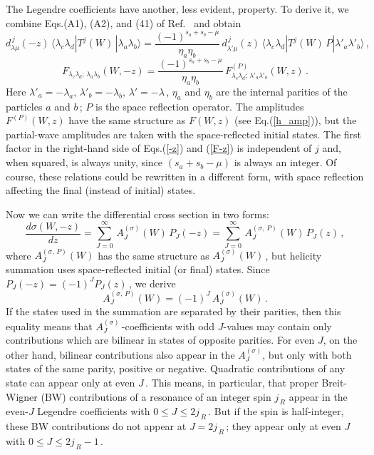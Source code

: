 \documentclass[prc,reprint,onecolumn,amsmath,amssymb,superscriptaddress]{revtex4-1}
\newcommand{\be}{\begin{equation}}
\newcommand{\ee}{\end{equation}}
\begin{document}
The Legendre coefficients have another, less evident, property. To derive it, we
combine Eqs.(A1), (A2), and (41) of Ref.~\cite{jw} and obtain
\be
	d^{\,j}_{\lambda\mu}(-z)\,\langle\lambda_c\lambda_d|T^j(W)\,|\lambda_a
	\lambda_b\rangle =\frac{(-1)^{s_a+s_b-\mu}}{\eta_a \eta_b}\, d^{\,j}_{\lambda'\mu}(z)
	\,\langle\lambda_c\lambda_d|T^j(W)\,P|\lambda'_a\lambda'_b\rangle\,,
	\label{-z}
\ee
\be
	F_{\lambda_c\lambda_d;\,\lambda_a\lambda_b}(W,-z)=\frac{(-1)^{s_a+s_b-\mu}}
	{\eta_a \eta_b}\,F^{(P)}_{\lambda_c\lambda_d;\,\lambda'_a\lambda'_b}(W,z)\,.
	\label{F-z}
\ee
Here $\lambda'_a=-\lambda_a,\,\lambda'_b=-\lambda_b,\,\lambda'=-\lambda\,$,
$\eta_a$ and $\eta_b$ are the internal parities of the particles $a$ and $b\,$;
$P$ is the space reflection operator. The amplitudes $F^{(P)}(W,z)$ have the 
same structure as $F(W,z)$ (see Eq.(\ref{h_amp})), but the partial-wave 
amplitudes are taken with the space-reflected initial states. The first factor 
in the right-hand side of Eqs.(\ref{-z}) and (\ref{F-z}) is independent of $j$ 
and, when squared, is always unity, since $(s_a+s_b-\mu)$ is always an integer. 
Of course, these relations could be rewritten in a different form, with space 
reflection affecting the final (instead of initial) states.

Now we can write the differential cross section in two forms:
\be
	\frac{d\sigma(W,-z)}{d z}=\sum_{J=0}^{\infty}\,A^{(\sigma)}_J(W)\,P_J(-z)=
	\sum_{J=0}^{\infty}\,A_J^{(\sigma,\,P)}(W)\,P_J(z)\,,
	\label{crs-z}
\ee
where $A_J^{(\sigma,\,P)}(W)$ has the same structure as $A^{(\sigma)}_J(W)\,$,
but helicity summation uses space-reflected initial (or final) states. Since
$P_J(-z)=(-1)^J P_J(z)\,$, we derive
\be
	A_J^{(\sigma,\,P)}(W)=(-1)^J\,A^{(\sigma)}_J(W)\,.
	\label{coefP}
\ee
If the states used in the summation are separated by their parities, then this
equality means that \mbox{$A^{(\sigma)}_J\,$-coefficients} with odd $J$-values 
may contain only contributions which are bilinear in states of opposite parities. 
For even $J$, on the other hand, bilinear contributions also appear in the 
$A^{(\sigma)}_J$, but only with both states of the same parity, positive or 
negative. Quadratic contributions of any state can appear only at even $J\,$. 
This means, in particular, that proper Breit-Wigner (BW) contributions of a 
resonance of an integer spin $j_{\,R}$ appear in the \mbox{even-$J$} Legendre 
coefficients with $0\leq J\leq2j_{\,R}\,$. But if the spin is half-integer, 
these BW contributions do not appear at $J=2j_{\,R}\,$; they appear only at 
even $J$ with $0\leq J\leq2j_{\,R}-1\,$.
\end{document}
